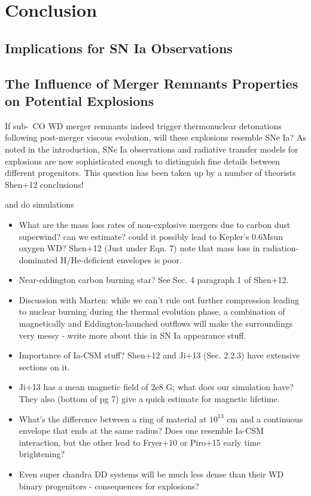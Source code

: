 \chapter{Conclusion}

\section{Implications for SN Ia Observations}

\section{The Influence of Merger Remnants Properties on Potential Explosions}

If sub-\Mch\ CO WD merger remnants indeed trigger thermonuclear detonations following post-merger viscous evolution, will these explosions resemble SNe Ia?  As noted in the introduction, SNe Ia observations and radiative transfer models for explosions are now sophisticated enough to distinguish fine details between different progenitors.  This question has been taken up by a number of theorists \citep{frye+10, shen+12}  Shen+12 conclusions!

\cite{frye+10} and \cite{rask+14} do simulations

\begin{itemize}
	\item What are the mass loss rates of non-explosive mergers due to carbon dust superwind?  can we estimate?  could it possibly lead to Kepler's 0.6Msun oxygen WD? Shen+12 (Just under Eqn. 7) note that mass loss in radiation-dominated H/He-deficient envelopes is poor. %
	\item Near-eddington carbon burning star?  See Sec. 4 paragraph 1 of Shen+12.
	\item Discussion with Marten: while we can't rule out further compression leading to nuclear burning during the thermal evolution phase, a combination of magnetically and Eddington-launched outflows will make the surroundings very messy - write more about this in SN Ia appearance stuff.
	\item Importance of Ia-CSM stuff?  Shen+12 and Ji+13 (Sec. 2.2.3) have extensive sections on it.
	\item Ji+13 has a mean magnetic field of 2e8 G; what does our simulation have?  They also (bottom of pg 7) give a quick estimate for magnetic lifetime.
	\item What's the difference between a ring of material at $10^{13}$ cm and a continuous envelope that ends at the same radius?  Does one resemble Ia-CSM interaction, but the other lead to Fryer+10 or Piro+15 early time brightening?
	\item Even super chandra DD systems will be much less dense than their WD binary progenitors - consequences for explosions?
\end{itemize}
